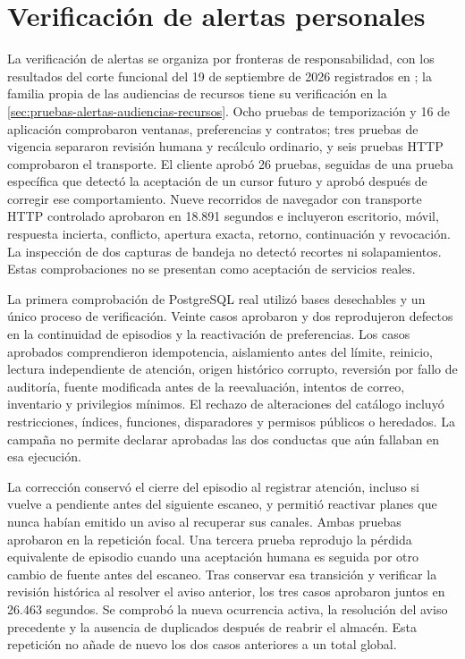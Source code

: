 \section{Verificación de alertas personales}\label{sec:pruebas-alertas}

La verificación de alertas se organiza por fronteras de responsabilidad, con los resultados del corte funcional del 19 de septiembre de 2026 registrados en ; la familia propia de las audiencias de recursos tiene su verificación en la \cref{sec:pruebas-alertas-audiencias-recursos}. Ocho pruebas de temporización y 16 de aplicación comprobaron ventanas, preferencias y contratos; tres pruebas de vigencia separaron revisión humana y recálculo ordinario, y seis pruebas HTTP comprobaron el transporte. El cliente aprobó 26 pruebas, seguidas de una prueba específica que detectó la aceptación de un cursor futuro y aprobó después de corregir ese comportamiento. Nueve recorridos de navegador con transporte HTTP controlado aprobaron en 18.891 segundos e incluyeron escritorio, móvil, respuesta incierta, conflicto, apertura exacta, retorno, continuación y revocación. La inspección de dos capturas de bandeja no detectó recortes ni solapamientos. Estas comprobaciones no se presentan como aceptación de servicios reales.

La primera comprobación de PostgreSQL real utilizó bases desechables y un único proceso de verificación. Veinte casos aprobaron y dos reprodujeron defectos en la continuidad de episodios y la reactivación de preferencias. Los casos aprobados comprendieron idempotencia, aislamiento antes del límite, reinicio, lectura independiente de atención, origen histórico corrupto, reversión por fallo de auditoría, fuente modificada antes de la reevaluación, intentos de correo, inventario y privilegios mínimos. El rechazo de alteraciones del catálogo incluyó restricciones, índices, funciones, disparadores y permisos públicos o heredados. La campaña no permite declarar aprobadas las dos conductas que aún fallaban en esa ejecución.

La corrección conservó el cierre del episodio al registrar atención, incluso si vuelve a pendiente antes del siguiente escaneo, y permitió reactivar planes que nunca habían emitido un aviso al recuperar sus canales. Ambas pruebas aprobaron en la repetición focal. Una tercera prueba reprodujo la pérdida equivalente de episodio cuando una aceptación humana es seguida por otro cambio de fuente antes del escaneo. Tras conservar esa transición y verificar la revisión histórica al resolver el aviso anterior, los tres casos aprobaron juntos en 26.463 segundos. Se comprobó la nueva ocurrencia activa, la resolución del aviso precedente y la ausencia de duplicados después de reabrir el almacén. Esta repetición no añade de nuevo los dos casos anteriores a un total global.

